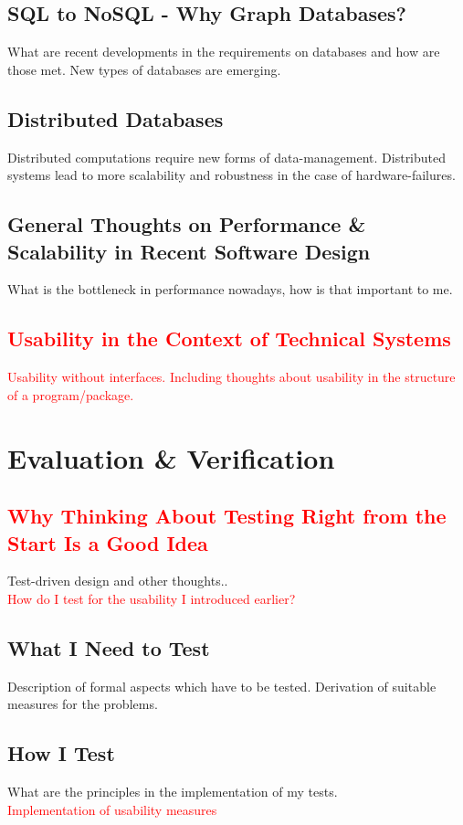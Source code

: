 \documentclass[12p]{scrartcl}
\begin{document}
\subsection{SQL to NoSQL - Why Graph Databases?}
What are recent developments in the requirements on databases and how are those met. New types of databases are emerging.
\subsection{Distributed Databases}
Distributed computations require new forms of data-management. Distributed systems lead to more scalability and robustness in the case of hardware-failures.
\subsection{General Thoughts on Performance \& Scalability in Recent Software Design}
What is the bottleneck in performance nowadays, how is that important to me.

\subsection{\textcolor{red}{Usability in the Context of Technical Systems}}
\textcolor{red}{Usability without interfaces. Including thoughts about usability in the structure of a program/package.}



\section{Evaluation \& Verification}
\label{sec:evaluation}
\subsection{\textcolor{red}{Why Thinking About Testing Right from the Start Is a Good Idea}}
Test-driven design and other thoughts..\\
\textcolor{red}{How do I test for the usability I introduced earlier?}
\subsection{What I Need to Test}
Description of formal aspects which have to be tested. Derivation of suitable measures for the problems.
\subsection{How I Test}
What are the principles in the implementation of my tests.\\
\textcolor{red}{Implementation of usability measures}
 
\end{document}
